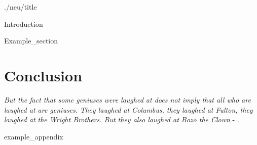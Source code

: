 \documentclass{article}
\begin{document}
{./neu/title}

\frontmatter

\tableofcontents

\listoffigures
\listoftables

\mainmatter

{Introduction}

{Example_section}

\section{Conclusion}
\textit{But the fact that some geniuses were laughed at does not imply that all who are laughed at are geniuses. They laughed at Columbus, they laughed at Fulton, they laughed at the Wright Brothers. But they also laughed at Bozo the Clown} -  \textcite{sagan_1993}.

\newpage
\printbibliography[heading = bibintoc, title = Bibliography]    %

\addappendix
{example_appendix}

\end{document}
